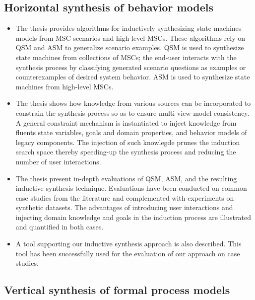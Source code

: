 
\subsection{Horizontal synthesis of behavior models\label{subsection:intro-contrib-inductive-synthesis}}
\begin{itemize}
\item The thesis provides algorithms for inductively synthesizing state machines models from MSC scenarios and high-level MSCs. These algorithms rely on QSM and ASM to generalize scenario examples. QSM is used to synthesize state machines from collections of MSCs; the end-user interacts with the synthesis process by classifying generated scenario questions as examples or counterexamples of desired system behavior. ASM is used to synthesize state machines from high-level MSCs.
\item The thesis shows how knowledge from various sources can be incorporated to constrain the synthesis process so as to ensure multi-view model consistency. A general constraint mechanism is instantiated to inject knowledge from fluents state variables, goals and domain properties, and behavior models of legacy components. The injection of such knowlegde prunes the induction search space thereby speeding-up the synthesis process and reducing the number of user interactions.
\item The thesis present in-depth evaluations of QSM, ASM, and the resulting inductive synthesis technique. Evaluations have been conducted on common case studies from the literature and complemented with experiments on synthetic datasets. The advantages of introducing user interactions and injecting domain knowledge and goals in the induction process are illustrated and quantified in both cases.
\item A tool supporting our inductive synthesis approach is also described. This tool has been successfully used for the evaluation of our approach on case studies.
\end{itemize}


\subsection{Vertical synthesis of formal process models\label{subsection:intro-contib-supporting-process-models}}

